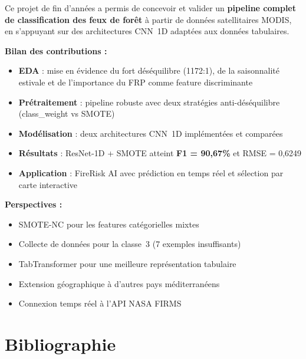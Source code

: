 \documentclass[12pt,a4paper]{report}
\begin{document}
\justifying
Ce projet de fin d'ann\'{e}es a permis de concevoir et valider un \textbf{pipeline complet de classification des feux de for\^{e}t} \`{a} partir de donn\'{e}es satellitaires MODIS, en s'appuyant sur des architectures CNN~1D adapt\'{e}es aux donn\'{e}es tabulaires.

\medskip
\textbf{Bilan des contributions :}
\begin{itemize}
    \item \textbf{EDA} : mise en \'{e}vidence du fort d\'{e}s\'{e}quilibre (1172:1), de la saisonnalit\'{e} estivale et de l'importance du FRP comme feature discriminante
    \item \textbf{Pr\'{e}traitement} : pipeline robuste avec deux strat\'{e}gies anti-d\'{e}s\'{e}quilibre (class\_weight vs SMOTE)
    \item \textbf{Mod\'{e}lisation} : deux architectures CNN~1D impl\'{e}ment\'{e}es et compar\'{e}es
    \item \textbf{R\'{e}sultats} : ResNet-1D + SMOTE atteint \textbf{F1 = 90,67\%} et RMSE = 0,6249
    \item \textbf{Application} : FireRisk AI avec pr\'{e}diction en temps r\'{e}el et s\'{e}lection par carte interactive
\end{itemize}

\medskip
\textbf{Perspectives :}
\begin{itemize}
    \item SMOTE-NC pour les features cat\'{e}gorielles mixtes
    \item Collecte de donn\'{e}es pour la classe~3 (7 exemples insuffisants)
    \item TabTransformer pour une meilleure repr\'{e}sentation tabulaire
    \item Extension g\'{e}ographique \`{a} d'autres pays m\'{e}diterran\'{e}ens
    \item Connexion temps r\'{e}el \`{a} l'API NASA FIRMS
\end{itemize}

\chapter*{Bibliographie}
\end{document}
